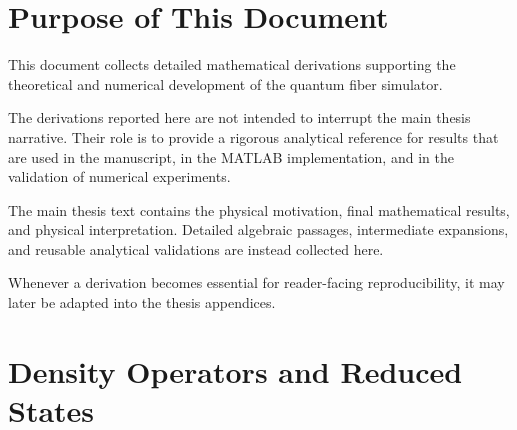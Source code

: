 \documentclass[a4paper,12pt]{report}
\begin{document}
\maketitle


\chapter*{Purpose of This Document}

This document collects detailed mathematical derivations supporting the theoretical and numerical development of the quantum fiber simulator.

The derivations reported here are not intended to interrupt the main thesis narrative. Their role is to provide a rigorous analytical reference for results that are used in the manuscript, in the MATLAB implementation, and in the validation of numerical experiments.

\medskip

The main thesis text contains the physical motivation, final mathematical results, and physical interpretation. Detailed algebraic passages, intermediate expansions, and reusable analytical validations are instead collected here.

\medskip

Whenever a derivation becomes essential for reader-facing reproducibility, it may later be adapted into the thesis appendices.

\tableofcontents


\chapter{Density Operators and Reduced States}





\end{document}
